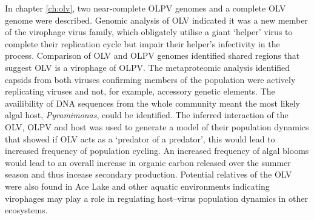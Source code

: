 In chapter \ref{ch:olv}, two near-complete \ac{OLPV} genomes and a complete \ac{OLV} genome were described.
Genomic analysis of \ac{OLV} indicated it was a new member of the virophage virus family, which obligately utilise a  giant `helper' virus to complete their replication cycle but impair their helper's infectivity in the process.
Comparison of \ac{OLV} and \ac{OLPV} genomes identified shared regions that suggest \ac{OLV} is a virophage of \ac{OLPV}.
The metaproteomic analysis identified capsids from both viruses confirming members of the population were actively replicating viruses and not, for example, accessory genetic elements.
The availibility of \textsc{DNA} sequences from the whole community meant the most likely algal host, \emph{Pyramimonas}, could be identified.
The inferred interaction of the \ac{OLV}, \ac{OLPV} and host was used to generate a model of their population dynamics that showed if \ac{OLV} acts as a `predator of a predator', this would lead to increased frequency of population cycling.
An increased frequency of algal blooms would lead to an overall increase in organic carbon released over the summer season and thus incease secondary production.
Potential relatives of the \ac{OLV} were also found in Ace Lake and other aquatic environments indicating virophages may play a role in regulating host--virus population dynamics in other ecosystems.

